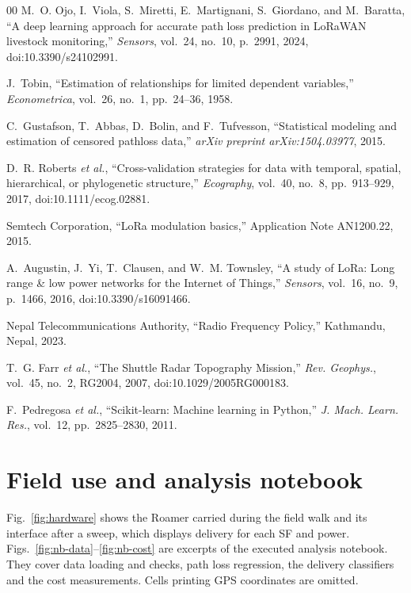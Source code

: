 \documentclass[conference]{IEEEtran}
\begin{document}
\begin{thebibliography}{00}
M.~O. Ojo, I.~Viola, S.~Miretti, E.~Martignani, S.~Giordano, and M.~Baratta, ``A deep learning approach for accurate path loss prediction in LoRaWAN livestock monitoring,'' \emph{Sensors}, vol.~24, no.~10, p.~2991, 2024, doi:10.3390/s24102991.

J.~Tobin, ``Estimation of relationships for limited dependent variables,'' \emph{Econometrica}, vol.~26, no.~1, pp.~24--36, 1958.

C.~Gustafson, T.~Abbas, D.~Bolin, and F.~Tufvesson, ``Statistical modeling and estimation of censored pathloss data,'' \emph{arXiv preprint arXiv:1504.03977}, 2015.

D.~R. Roberts \emph{et al.}, ``Cross-validation strategies for data with temporal, spatial, hierarchical, or phylogenetic structure,'' \emph{Ecography}, vol.~40, no.~8, pp.~913--929, 2017, doi:10.1111/ecog.02881.

Semtech Corporation, ``LoRa modulation basics,'' Application Note AN1200.22, 2015.

A.~Augustin, J.~Yi, T.~Clausen, and W.~M. Townsley, ``A study of LoRa: Long range \& low power networks for the Internet of Things,'' \emph{Sensors}, vol.~16, no.~9, p.~1466, 2016, doi:10.3390/s16091466.

Nepal Telecommunications Authority, ``Radio Frequency Policy,'' Kathmandu, Nepal, 2023.

T.~G. Farr \emph{et al.}, ``The Shuttle Radar Topography Mission,'' \emph{Rev. Geophys.}, vol.~45, no.~2, RG2004, 2007, doi:10.1029/2005RG000183.

F.~Pedregosa \emph{et al.}, ``Scikit-learn: Machine learning in Python,'' \emph{J. Mach. Learn. Res.}, vol.~12, pp.~2825--2830, 2011.

\end{thebibliography}

\appendices
\section{Field use and analysis notebook}\label{app:hw}
Fig.~\ref{fig:hardware} shows the Roamer carried during the field walk and its interface after a sweep, which displays delivery for each SF and power. Figs.~\ref{fig:nb-data}--\ref{fig:nb-cost} are excerpts of the executed analysis notebook. They cover data loading and checks, path loss regression, the delivery classifiers and the cost measurements. Cells printing GPS coordinates are omitted.
\end{document}
